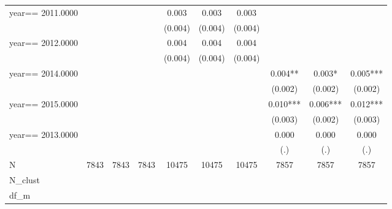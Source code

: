 \begin{table}[htbp]
\begin{tabular}{l*{9}{c}}
year==  2011.0000   &               &               &               &       0.003   &       0.003   &       0.003   &               &               &               \\
                    &               &               &               &     (0.004)   &     (0.004)   &     (0.004)   &               &               &               \\
year==  2012.0000   &               &               &               &       0.004   &       0.004   &       0.004   &               &               &               \\
                    &               &               &               &     (0.004)   &     (0.004)   &     (0.004)   &               &               &               \\
year==  2014.0000   &               &               &               &               &               &               &       0.004** &       0.003*  &       0.005***\\
                    &               &               &               &               &               &               &     (0.002)   &     (0.002)   &     (0.002)   \\
year==  2015.0000   &               &               &               &               &               &               &       0.010***&       0.006***&       0.012***\\
                    &               &               &               &               &               &               &     (0.003)   &     (0.002)   &     (0.003)   \\
year==  2013.0000   &               &               &               &               &               &               &       0.000   &       0.000   &       0.000   \\
                    &               &               &               &               &               &               &         (.)   &         (.)   &         (.)   \\
\hline
N                   &        7843   &        7843   &        7843   &       10475   &       10475   &       10475   &        7857   &        7857   &        7857   \\
N\_clust             &               &               &               &               &               &               &               &               &               \\
df\_m                &               &               &               &               &               &               &               &               &               \\

\end{tabular}
\end{table}

